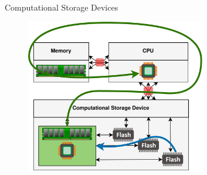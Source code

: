\documentclass{beamer}
\begin{document}
\begin{frame}{Computational Storage Devices}
	\begingroup
	\small
	\begin{figure}
		\centering
		\includegraphics[width=0.7\textwidth]{resources/images/csd.png}
	\end{figure}
	\endgroup
\end{frame}
\end{document}
